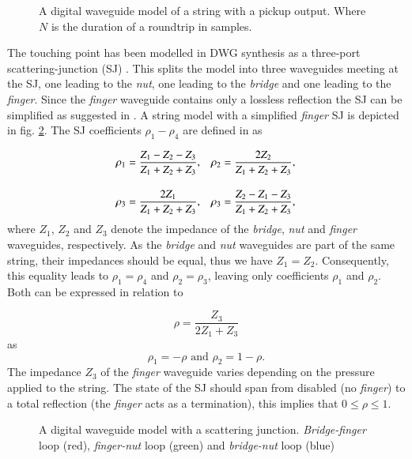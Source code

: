 \documentclass{sigchi}
\begin{document}
\begin{figure}[h]
	\centering
	\scalebox{0.75}{}
	\caption{
		A digital waveguide model of a string with a pickup output.
		Where $N$ is the duration of a roundtrip in samples.
	}
	\label{fig:pickup}
\end{figure}

The touching point has been modelled in DWG synthesis as a three-port scattering-junction (SJ) \cite{scavone_digital_1997, valimaki_modeling_1993}.
This splits the model into three waveguides meeting at the SJ, one leading to the \textit{nut}, one leading to the \textit{bridge} and one leading to the \textit{finger}.
Since the \textit{finger} waveguide contains only a lossless reflection the SJ can be simplified as suggested in \cite{pakarinen_physical_2005}.
A string model with a simplified \textit{finger} SJ is depicted in fig. \ref{fig:waveguide_sj}.
The SJ coefficients $\rho_1 - \rho_4$ are defined in \cite{pakarinen_physical_2005} as

\begin{align} \label{eq:rhoCoeff}
	\rho_1 & = \frac{Z_1-Z_2-Z_3}{Z_1+Z_2+Z_3},       &
	\rho_2 & = \frac{2Z_2}{Z_1+Z_2+Z_3},\notag   \\[1em]
	\rho_3 & = \frac{2Z_1}{Z_1+Z_2+Z_3},       &
	\rho_3 & = \frac{Z_2-Z_1-Z_3}{Z_1+Z_2+Z_3},
\end{align}
where $Z_1$, $Z_2$ and $Z_3$ denote the impedance of the \textit{bridge}, \textit{nut} and \textit{finger} waveguides, respectively.
As the \textit{bridge} and \textit{nut} waveguides are part of the same string, their impedances should be equal, thus we have $Z_1=Z_2$.
Consequently, this equality leads to $\rho_1=\rho_4$ and $\rho_2=\rho_3$, leaving only coefficients $\rho_1$ and $\rho_2$.
Both can be expressed in relation to

\begin{equation} \label{eq:rho}
	\rho=\frac{Z_3}{2Z_1+Z_3}
\end{equation}
as
\begin{equation}
	\rho_1=-\rho \text{ and } \rho_2=1-\rho.
\end{equation}
The impedance $Z_3$ of the \textit{finger} waveguide varies depending on the pressure applied to the string.
The state of the SJ should span from disabled (no \textit{finger}) to a total reflection (the \textit{finger} acts as a termination), this implies that $0 \leq \rho \leq 1$.

\begin{figure}[h]
	\centering
	\scalebox{0.56}{}
	\caption{A digital waveguide model with a scattering junction.
	\textit{Bridge-finger} loop (red), \textit{finger-nut} loop (green) and \textit{bridge-nut} loop (blue)}
	\label{fig:waveguide_sj}
\end{figure}
\end{document}
